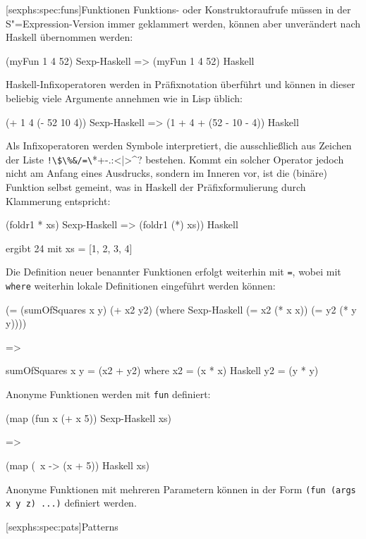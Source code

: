 \documentclass[11pt, a4paper, bibgerm]{scrbook}
\newcommand\icode[1]{\lstinline?#1?}
\newcommand\lsubsection{}
\newcommand{\sexp}{S"=Expression}
\begin{document}
\lsubsection[sexphs:spec:funs]{Funktionen}
Funktions- oder Konstruktoraufrufe müssen in der \sexp{}-Version immer
geklammert werden, können aber unverändert nach Haskell übernommen
werden:
\begin{code}
(myFun 1 4 52)              Sexp-Haskell
=>
(myFun 1 4 52)              Haskell
\end{code}
Haskell-Infixoperatoren werden in Präfixnotation überführt und können
in dieser beliebig viele Argumente annehmen wie in Lisp üblich:
\begin{code}
(+ 1 4 (- 52 10 4))         Sexp-Haskell
=>
(1 + 4 + (52 - 10 - 4))     Haskell
\end{code}
Als Infixoperatoren werden Symbole interpretiert, die ausschließlich
aus Zeichen der Liste \icode{!\$\%&/=\?*+-.:<|>^}
bestehen. Kommt ein solcher Operator jedoch nicht am Anfang eines
Ausdrucks, sondern im Inneren vor, ist die (binäre) Funktion selbst
gemeint, was in Haskell der Präfixformulierung durch Klammerung
entspricht:
\begin{code}
(foldr1 * xs)               Sexp-Haskell
=>
(foldr1 (*) xs))            Haskell

ergibt 24 mit xs = [1, 2, 3, 4]
\end{code}
Die Definition neuer benannter Funktionen erfolgt weiterhin mit
\icode{=}, wobei mit \icode{where} weiterhin lokale Definitionen
eingeführt werden können:
\begin{code}
(= (sumOfSquares x y)
   (+ x2 y2)
 (where                     Sexp-Haskell
  (= x2 (* x x))
  (= y2 (* y y))))

=>

sumOfSquares x y = (x2 + y2)
  where
    x2 = (x * x)            Haskell
    y2 = (y * y)
\end{code}
Anonyme Funktionen werden mit \icode{fun} definiert:
\begin{code}
(map 
  (fun x (+ x 5))           Sexp-Haskell
  xs)

=>

(map
  (\ x -> (x + 5))          Haskell
  xs)
\end{code}
Anonyme Funktionen mit mehreren Parametern können in der Form
\icode{(fun (args x y z) ...)} definiert werden.

\lsubsection[sexphs:spec:pats]{Patterns}
\end{document}
